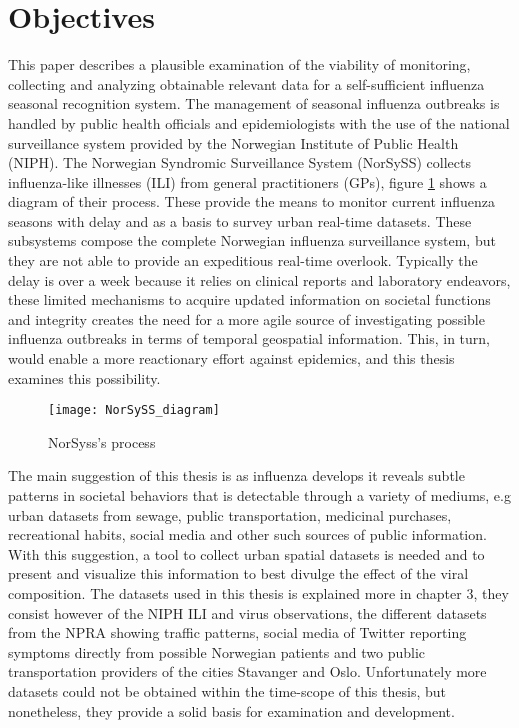 \section{Objectives}
This paper describes a plausible examination of the viability of monitoring, collecting and analyzing obtainable relevant data for a self-sufficient influenza seasonal recognition system. The management of seasonal influenza outbreaks is handled by public health officials and epidemiologists with the use of the national surveillance system provided by the Norwegian Institute of Public Health (NIPH)\cite{niph}. The Norwegian Syndromic Surveillance System (NorSySS) collects influenza-like illnesses (ILI) from general practitioners (GPs)\cite{NorSySS}, figure \ref{fig:norsyss} shows a diagram of their process. These provide the means to monitor current influenza seasons with delay and as a basis to survey urban real-time datasets. These subsystems compose the complete Norwegian influenza surveillance system, but they are not able to provide an expeditious real-time overlook. Typically the delay is over a week because it relies on clinical reports and laboratory endeavors, these limited mechanisms to acquire updated information on societal functions and integrity creates the need for a more agile source of investigating possible influenza outbreaks in terms of temporal geospatial information. This, in turn, would enable a more reactionary effort against epidemics, and this thesis examines this possibility.

\begin{figure}[h]
\texttt{[image: NorSySS\_diagram]}
\centering
\caption{NorSyss's process}
\label{fig:norsyss}
\end{figure}

The main suggestion of this thesis is as influenza develops it reveals subtle patterns in societal behaviors that is detectable through a variety of mediums, e.g urban datasets from sewage, public transportation, medicinal purchases, recreational habits, social media and other such sources of public information. With this suggestion, a tool to collect urban spatial datasets is needed and to present and visualize this information to best divulge the effect of the viral composition. The datasets used in this thesis is explained more in chapter 3, they consist however of the NIPH ILI and virus observations, the different datasets from the NPRA showing traffic patterns, social media of Twitter reporting symptoms directly from possible Norwegian patients and two public transportation providers of the cities Stavanger and Oslo. Unfortunately more datasets could not be obtained within the time-scope of this thesis, but nonetheless, they provide a solid basis for examination and development.

